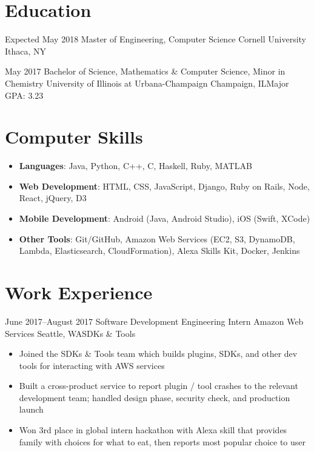 \documentclass[10pt,a4paper,sans]{moderncv}        %
\begin{document}
\makecvtitle

\section{Education}

\vspace{2pt}
\cventry
{Expected May 2018}
{Master of Engineering, Computer Science}
{Cornell University}
{Ithaca, NY}{}{}

\cventry
{May 2017}
{Bachelor of Science, Mathematics \& Computer Science, Minor in Chemistry}
{University of Illinois at Urbana-Champaign}
{Champaign, IL}{}{Major GPA: 3.23}

\section{Computer Skills}
\vspace{2pt}
\begin{itemize}
  \vspace{3pt}
  \item
    \textbf{Languages}: Java, Python, C++, C, Haskell, Ruby, MATLAB
  \item
    \textbf{Web Development}: HTML, CSS, JavaScript, Django, Ruby on Rails, Node,
                              React, jQuery, D3
  \item
    \textbf{Mobile Development}: Android (Java, Android Studio), iOS (Swift, XCode)
  \item
    \textbf{Other Tools}: Git/GitHub, Amazon Web Services (EC2, S3, DynamoDB, Lambda, Elasticsearch, CloudFormation),
     Alexa Skills Kit, Docker, Jenkins
\end{itemize}

\section{Work Experience}
\vspace{2pt}

\cventry
{June 2017--August 2017}
{\vspace{3pt}Software Development Engineering Intern}
{Amazon Web Services}
{Seattle, WA}{SDKs \& Tools}
{
\begin{itemize}
  \item Joined the SDKs \& Tools team which builds plugins, SDKs, and other dev tools for interacting with AWS services
  \item Built a cross-product service to report plugin / tool crashes to the relevant development team; handled design phase, security check, and production launch
  \item Won 3rd place in global intern hackathon with Alexa skill that provides family with choices for what to eat, then reports most popular choice to user
\end{itemize}}
\end{document}
